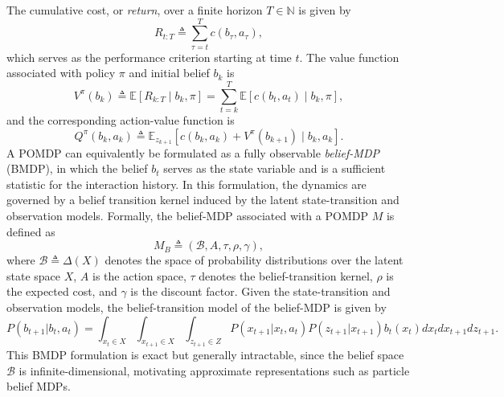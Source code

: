 \documentclass[acmlarge, manuscript, screen, review, natbib=false, oneside]{acmart}
\begin{document}
The cumulative cost, or \emph{return}, over a finite horizon $T \in \mathbb{N}$ is given by
\begin{equation}
	R_{t:T} \triangleq \sum_{\tau=t}^T c(b_\tau, a_\tau),
\end{equation}
which serves as the performance criterion starting at time $t$. The value function associated with policy $\pi$ and initial belief $b_k$ is
\begin{equation}\label{Eq:regular_V_function}
	V^\pi(b_k) \triangleq \mathbb{E}[R_{k:T} \mid b_k, \pi] = \sum_{t=k}^T \mathbb{E}[c(b_t, a_t) \mid b_k, \pi],
\end{equation}
and the corresponding action-value function is
\begin{equation}\label{Eq:regular_Q_function}
	Q^\pi(b_k, a_k) \triangleq \mathbb{E}_{z_{k+1}}\!\left[c(b_k, a_k) + V^\pi(b_{k+1}) \mid b_k, a_k \right].
\end{equation}
A POMDP can equivalently be formulated as a fully observable \emph{belief-MDP} (BMDP), in which the belief $b_t$ serves as the state variable and is a sufficient statistic for the interaction history. In this formulation, the dynamics are governed by a belief transition kernel induced by the latent state-transition and observation models. Formally, the belief-MDP associated with a POMDP $M$ is defined as
\begin{equation}
	M_B \triangleq (\mathcal{B}, A, \tau, \rho, \gamma),
\end{equation}
where $\mathcal{B} \triangleq \Delta(X)$ denotes the space of probability distributions over the latent state space $X$, $A$ is the action space, $\tau$ denotes the belief-transition kernel, $\rho$ is the expected cost, and $\gamma$ is the discount factor. Given the state-transition and observation models, the belief-transition model of the belief-MDP is given by
\begin{equation}
	P(b_{t+1}|b_{t},a_t)=\int_{x_t \in X}\int_{x_{t+1}\in X}\int_{z_{t+1}\in Z}P(x_{t+1}|x_t,a_t)P(z_{t+1}|x_{t+1})b_t(x_t)dx_{t}dx_{t+1}dz_{t+1}.
\end{equation}
This BMDP formulation is exact but generally intractable, since the belief space $\mathcal{B}$ is infinite-dimensional, motivating approximate representations such as particle belief MDPs.
\end{document}
